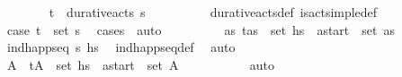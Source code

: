 \begin{isabellebody}
\ \ \ \ \ \ \isamarkupfalse%
\ {\isachardoublequoteopen}{\isacharparenleft}{\kern0pt}t\isactrlsub {\isasympi}{\isacharcomma}{\kern0pt}{\isasympi}{\isacharparenright}{\kern0pt}\ {\isasymin}\ durative{\isacharunderscore}{\kern0pt}acts\ {\isasympi}s{\isachardoublequoteclose}\isanewline
\ \ \ \ \ \ \ \ \isamarkupfalse%
\ durative{\isacharunderscore}{\kern0pt}acts{\isacharunderscore}{\kern0pt}def\ is{\isacharunderscore}{\kern0pt}act{\isacharunderscore}{\kern0pt}simple{\isacharunderscore}{\kern0pt}def\isanewline
\ \ \ \ \ \ \ \ \isamarkupfalse%
\ {\isacartoucheopen}{\isacharquery}{\kern0pt}case{}{\isacartoucheclose}\ {\isacartoucheopen}{\isacharparenleft}{\kern0pt}t\isactrlsub {\isasympi}{\isacharcomma}{\kern0pt}{\isasympi}{\isacharparenright}{\kern0pt}\ {\isasymin}\ set\ {\isasympi}s{\isacartoucheclose}\ \isamarkupfalse%
\ {\isacharparenleft}{\kern0pt}cases\ {\isasympi}{\isacharparenright}{\kern0pt}\ auto\isanewline
\ \ \ \ \ \ \isamarkupfalse%
\ \isamarkupfalse%
\ {\isachardoublequoteopen}{\isasymexists}as{\isachardot}{\kern0pt}\ {\isacharparenleft}{\kern0pt}t\isactrlsub {\isasympi}{\isacharcomma}{\kern0pt}as{\isacharparenright}{\kern0pt}\ {\isasymin}\ set\ hs\ {\isasymand}\ {\isacharquery}{\kern0pt}a\isactrlsub s\isactrlsub t\isactrlsub a\isactrlsub r\isactrlsub t\ {\isasymin}\ set\ as{\isachardoublequoteclose}\isanewline
\ \ \ \ \ \ \ \ \isamarkupfalse%
\ {\isacartoucheopen}ind{\isacharunderscore}{\kern0pt}happ{\isacharunderscore}{\kern0pt}seq\ {\isasympi}s\ hs\ \isamarkupfalse%
\ ind{\isacharunderscore}{\kern0pt}happ{\isacharunderscore}{\kern0pt}seq{\isacharunderscore}{\kern0pt}def\ \isamarkupfalse%
\ auto\isanewline
\ \ \ \ \ \ \isamarkupfalse%
\ \isamarkupfalse%
\ A{\isacharprime}{\kern0pt}\ \ {\isachardoublequoteopen}{\isacharparenleft}{\kern0pt}t\isactrlsub {\isasympi}{\isacharcomma}{\kern0pt}A{\isacharprime}{\kern0pt}{\isacharparenright}{\kern0pt}\ {\isasymin}\ set\ hs\ \ {\isachardoublequoteopen}{\isacharquery}{\kern0pt}a\isactrlsub s\isactrlsub t\isactrlsub a\isactrlsub r\isactrlsub t\ {\isasymin}\ set\ A{\isacharprime}{\kern0pt}{\isachardoublequoteclose}\ \isanewline
\ \ \ \ \ \ \ \ \isamarkupfalse%
\ auto\isanewline
\ \ \ \ \ \ \isamarkupfalse%

\end{isabellebody}
